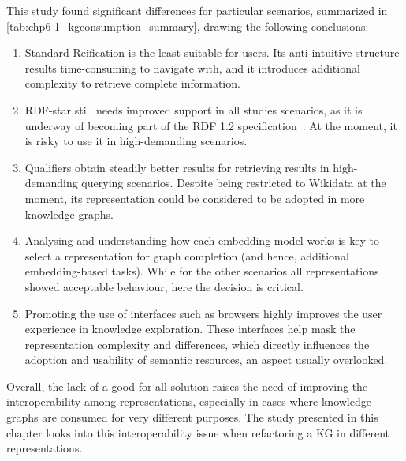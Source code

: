 This study found significant differences for particular scenarios, summarized in \cref{tab:chp6-1_kgconsumption_summary}, drawing the following conclusions: 
\begin{enumerate}
    \item Standard Reification is the least suitable for users. Its anti-intuitive structure results time-consuming to navigate with, and it introduces additional complexity to retrieve complete information.
    \item RDF-star still needs improved support in all studies scenarios, as it is underway of becoming part of the RDF 1.2 specification~\parencite{hartig2023rdf}. At the moment, it is risky to use it in high-demanding scenarios.
    \item Qualifiers obtain steadily better results for retrieving results in high-demanding querying scenarios. Despite being restricted to Wikidata at the moment, its representation could be considered to be adopted in more knowledge graphs.
    \item Analysing and understanding how each embedding model works is key to select a representation for graph completion (and hence, additional embedding-based tasks). While for the other scenarios all representations showed acceptable behaviour, here the decision is critical.
    \item Promoting the use of interfaces such as browsers highly improves the user experience in knowledge exploration. These interfaces help mask the representation complexity and differences, which directly influences the adoption and usability of semantic resources, an aspect usually overlooked.
\end{enumerate}

Overall, the lack of a good-for-all solution raises the need of improving the interoperability among representations, especially in cases where knowledge graphs are consumed for very different purposes. The study presented in this chapter looks into this interoperability issue when refactoring a KG in different representations.

